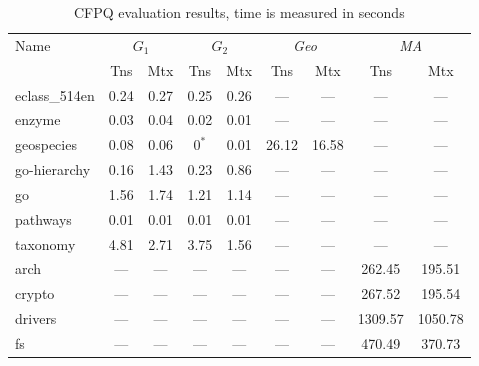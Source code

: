 {\setlength{\tabcolsep}{0.2em}
  \begin{table}
    \centering
    \caption{CFPQ evaluation results, time is measured in seconds}
    \label{tbl:CFPQ_index}
    \small
    \begin{tabular}{| l | c | c | c | c | c | c | c | c |}
      \hline

      \multirow{2}{*}{Name}  & \multicolumn{2}{c|}{$G_1$} & \multicolumn{2}{c|}{$G_2$} & \multicolumn{2}{c|}{\textit{Geo}} & \multicolumn{2}{c|}{\textit{MA}}\\
      \cline{2-9}
                      & Tns    & Mtx    & Tns  & Mtx  & Tns   & Mtx   & Tns     & Mtx \\
      \hline
      \hline
      eclass\_514en   & 0.24   & 0.27   & 0.25 & 0.26 & ---   & ---   & ---     & ---\\
      enzyme          & 0.03   & 0.04   & 0.02 & 0.01 & ---   & ---   & ---     & ---\\
      geospecies      & 0.08   & 0.06   & $0^{*}$ & 0.01 & 26.12 & 16.58 & ---     & ---\\
      go-hierarchy    & 0.16   & 1.43   & 0.23 & 0.86 & ---   & ---   & ---     & ---\\
      go              & 1.56   & 1.74   & 1.21 & 1.14 & ---   & ---   & ---     & ---\\
      pathways        & 0.01   & 0.01   & 0.01 & 0.01 & ---   & ---   & ---     & ---\\
      taxonomy        & 4.81   & 2.71   & 3.75 & 1.56 & ---   & ---   & ---     & ---\\
      \hline
      arch            & ---    & ---    & ---  & ---  & ---   & ---   & 262.45  & 195.51  \\
      crypto          & ---    & ---    & ---  & ---  & ---   & ---   & 267.52  & 195.54  \\
      drivers         & ---    & ---    & ---  & ---  & ---   & ---   & 1309.57 & 1050.78 \\
      fs              & ---    & ---    & ---  & ---  & ---   & ---   & 470.49  & 370.73  \\
      \hline
    \end{tabular}
  \end{table}
}


